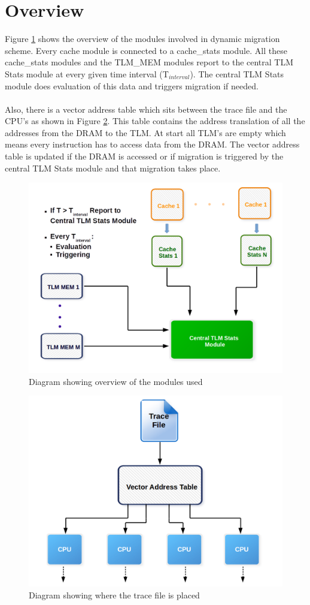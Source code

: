 \documentclass{listhesis}
\begin{document}
\section{Overview}
Figure \ref{fig:overviewOfSolution} shows the overview of the modules involved in dynamic migration scheme. Every cache module is connected to a cache{\_}stats module. All these cache{\_}stats modules and the TLM{\_}MEM modules report to the central TLM Stats module at every given time interval (T$_{interval}$). The central TLM Stats module does evaluation of this data and triggers migration if needed. \\
\\
Also, there is a vector address table which sits between the trace file and the CPU's as shown in Figure \ref{fig:traceFile}. This table contains the address translation of all the addresses from the DRAM to the TLM. At start all TLM's are empty which means every instruction has to access data from the DRAM. The vector address table is updated if the DRAM is accessed or if migration is triggered by the central TLM Stats module and that migration takes place.
\begin{figure}[h!]
  \includegraphics[width=0.7\linewidth]{overviewOfSolution.png}
  \centering
  \caption{Diagram showing overview of the modules used}
  \label{fig:overviewOfSolution}
\end{figure}
\begin{figure}[h!]
  \includegraphics[width=0.7\linewidth]{traceFile.png}
  \centering
  \caption{Diagram showing where the trace file is placed}
  \label{fig:traceFile}
\end{figure}
\end{document}
